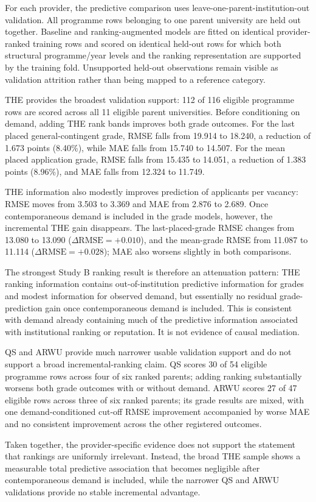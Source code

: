 For each provider, the predictive comparison uses leave-one-parent-institution-out validation. All programme rows belonging to one parent university are held out together. Baseline and ranking-augmented models are fitted on identical provider-ranked training rows and scored on identical held-out rows for which both structural programme/year levels and the ranking representation are supported by the training fold. Unsupported held-out observations remain visible as validation attrition rather than being mapped to a reference category.

THE provides the broadest validation support: 112 of 116 eligible programme rows are scored across all 11 eligible parent universities. Before conditioning on demand, adding THE rank bands improves both grade outcomes. For the last placed general-contingent grade, RMSE falls from 19.914 to 18.240, a reduction of 1.673 points (8.40\%), while MAE falls from 15.740 to 14.507. For the mean placed application grade, RMSE falls from 15.435 to 14.051, a reduction of 1.383 points (8.96\%), and MAE falls from 12.324 to 11.749.

THE information also modestly improves prediction of applicants per vacancy: RMSE moves from 3.503 to 3.369 and MAE from 2.876 to 2.689. Once contemporaneous demand is included in the grade models, however, the incremental THE gain disappears. The last-placed-grade RMSE changes from 13.080 to 13.090 ($\Delta\mathrm{RMSE}=+0.010$), and the mean-grade RMSE from 11.087 to 11.114 ($\Delta\mathrm{RMSE}=+0.028$); MAE also worsens slightly in both comparisons.

The strongest Study B ranking result is therefore an attenuation pattern: THE ranking information contains out-of-institution predictive information for grades and modest information for observed demand, but essentially no residual grade-prediction gain once contemporaneous demand is included. This is consistent with demand already containing much of the predictive information associated with institutional ranking or reputation. It is not evidence of causal mediation.

QS and ARWU provide much narrower usable validation support and do not support a broad incremental-ranking claim. QS scores 30 of 54 eligible programme rows across four of six ranked parents; adding ranking substantially worsens both grade outcomes with or without demand. ARWU scores 27 of 47 eligible rows across three of six ranked parents; its grade results are mixed, with one demand-conditioned cut-off RMSE improvement accompanied by worse MAE and no consistent improvement across the other registered outcomes.

Taken together, the provider-specific evidence does not support the statement that rankings are uniformly irrelevant. Instead, the broad THE sample shows a measurable total predictive association that becomes negligible after contemporaneous demand is included, while the narrower QS and ARWU validations provide no stable incremental advantage.
